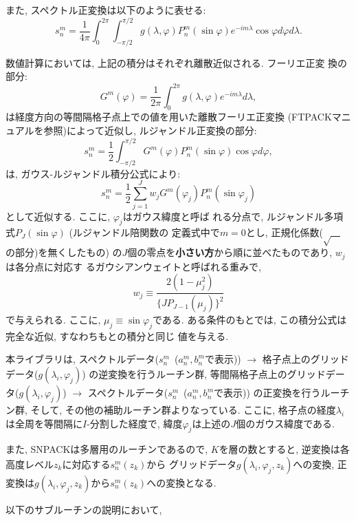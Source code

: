 \documentclass[a4j,fleqn]{jarticle}
\begin{document}
また, スペクトル正変換は以下のように表せる:
\begin{equation}
s^m_n=\frac1{4\pi}\int^{2\pi}_0\int^{\pi/2}_{-\pi/2}
g(\lambda,\varphi)P^m_n(\sin\varphi)e^{-im\lambda}\cos\varphi d\varphi
d\lambda .
\end{equation}

数値計算においては, 上記の積分はそれぞれ離散近似される. フーリエ正変
換の部分:
\begin{equation}
G^m(\varphi)=\frac1{2\pi}\int^{2\pi}_0
g(\lambda,\varphi)e^{-im\lambda}d\lambda,
\end{equation}
は経度方向の等間隔格子点上での値を用いた離散フーリエ正変換
(FTPACKマニュアルを参照)によって近似し,
ルジャンドル正変換の部分:
\begin{equation}
s^m_n=\frac12\int^{\pi/2}_{-\pi/2}
G^m(\varphi)P^m_n(\sin\varphi)\cos\varphi d\varphi,
\end{equation}
は, ガウス-ルジャンドル積分公式により:
\begin{equation}
s^m_n=\frac12\sum^J_{j=1}w_jG^m(\varphi_j)P^m_n(\sin\varphi_j)
\end{equation}
として近似する. ここに, $\varphi_j$はガウス緯度と呼ば
れる分点で, ルジャンドル多項式$P_J(\sin\varphi)$ (ルジャンドル陪関数の
定義式中で$m=0$とし, 正規化係数($\sqrt{\quad}$の部分)を無くしたもの)
の$J$個の零点を{\bf 小さい方}から順に並べたものであり, $w_j$は各分点に対応す
るガウシアンウェイトと呼ばれる重みで,
\begin{equation}
w_j\equiv\frac{2(1-\mu_j^2)}{\{JP_{J-1}(\mu_j)\}^2}
\end{equation}
で与えられる. ここに, $\mu_j\equiv\sin\varphi_j$である.
ある条件のもとでは, この積分公式は完全な近似, すなわちもとの積分と同じ
値を与える.

本ライブラリは, 
スペクトルデータ($s^m_n$\ ($a^m_n,b^m_n$で表示))
$\to$ 格子点上のグリッドデータ($g(\lambda_i,\varphi_j)$) 
の逆変換を行うルーチン群,
等間隔格子点上のグリッドデータ($g(\lambda_i,\varphi_j)$) 
$\to$ スペクトルデータ($s^m_n$\ ($a^m_n,b^m_n$で表示)) 
の正変換を行うルーチン群, 
そして, その他の補助ルーチン群よりなっている.
ここに, 格子点の経度$\lambda_i$は全周を等間隔に$I$-分割した経度で,
緯度$\varphi_j$は上述の$J$個のガウス緯度である.

また, SNPACKは多層用のルーチンであるので, $K$を層の数とすると, 
逆変換は各高度レベル$z_k$に対応する$s^m_n(z_k)$から
グリッドデータ$g(\lambda_i,\varphi_j,z_k)$への変換, 
正変換は$g(\lambda_i,\varphi_j,z_k)$から$s^m_n(z_k)$への変換となる.

以下のサブルーチンの説明において,
\end{document}
